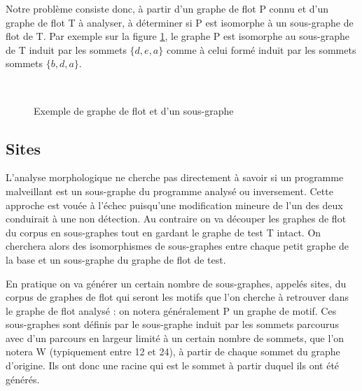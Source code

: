 Notre problème consiste donc, à partir d'un graphe de flot P connu et d'un graphe de flot T à analyser, à déterminer si P est isomorphe à un sous-graphe de flot de T.
Par exemple sur la figure \ref{fig:ex-gf-sous-gf}, le graphe P est isomorphe au sous-graphe de T induit par les sommets $\{d, e, a\}$ comme à celui formé induit par les sommets sommets $\{b, d, a\}$.


\begin{figure}[ht]
\begin{center}
  \subfigure[Graphe de flot T]{
\label{fig:ex-gf}
\texttt{[image: supports/algos/gTGF\_circo\_cropped0.pdf]}
}\quad
  \subfigure[Graphe de flot P, isomorphe à un sous-graphe de T]{
\label{fig:ex-sous-gf}
\texttt{[image: supports/algos/gPGF\_circo\_cropped0.pdf]}
}\\
\end{center}
\caption{Exemple de graphe de flot et d'un sous-graphe}
\label{fig:ex-gf-sous-gf}
\end{figure}

\subsection{Sites}
L'analyse morphologique \cite{BKM08} ne cherche pas directement à savoir si un programme malveillant est un sous-graphe du programme analysé ou inversement. 
Cette approche est vouée à l'échec puisqu'une modification mineure de l'un des deux conduirait à une non détection.
Au contraire on va découper les graphes de flot du corpus en sous-graphes tout en gardant le graphe de test T intact.
On cherchera alors des isomorphismes de sous-graphes entre chaque petit graphe de la base et un sous-graphe du graphe de flot de test.

En pratique on va générer un certain nombre de sous-graphes, appelés sites, du corpus de graphes de flot qui seront les motifs que l'on cherche à retrouver dans le graphe de flot analysé : on notera généralement P un graphe de motif. 
Ces sous-graphes sont définis par le sous-graphe induit par les sommets parcourus avec d'un parcours en largeur limité à un certain nombre de sommets, que l'on notera W (typiquement entre 12 et 24), à partir de chaque sommet du graphe d'origine. Ils ont donc une racine qui est le sommet à partir duquel ils ont été générés.

